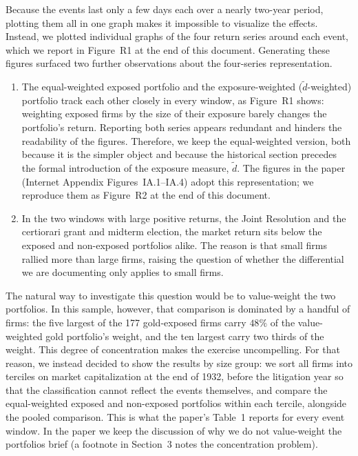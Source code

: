 \noindent Because the events last only a few days each over a nearly two-year period, plotting them all in one graph makes it impossible to visualize the effects. Instead, we plotted individual graphs of the four return series around each event, which we report in Figure~R1 at the end of this document. Generating these figures surfaced two further observations about the four-series representation.
\begin{enumerate}
\item The equal-weighted exposed portfolio and the exposure-weighted ($\tilde{d}$-weighted) portfolio track each other closely in every window, as Figure~R1 shows: weighting exposed firms by the size of their exposure barely changes the portfolio's return. Reporting both series appears redundant and hinders the readability of the figures. Therefore, we keep the equal-weighted version, both because it is the simpler object and because the historical section precedes the formal introduction of the exposure measure, $\tilde{d}$. The figures in the paper (Internet Appendix Figures~IA.1--IA.4) adopt this representation; we reproduce them as Figure~R2 at the end of this document.
\item In the two windows with large positive returns, the Joint Resolution and the certiorari grant and midterm election, the market return sits below the exposed and non-exposed portfolios alike. The reason is that small firms rallied more than large firms, raising the question of whether the differential we are documenting only applies to small firms.
\end{enumerate}
\noindent The natural way to investigate this question would be to value-weight the two portfolios. In this sample, however, that comparison is dominated by a handful of firms: the five largest of the 177 gold-exposed firms carry $48\%$ of the value-weighted gold portfolio's weight, and the ten largest carry two thirds of the weight. This degree of concentration makes the exercise uncompelling. For that reason, we instead decided to show the results by size group: we sort all firms into terciles on market capitalization at the end of 1932, before the litigation year so that the classification cannot reflect the events themselves, and compare the equal-weighted exposed and non-exposed portfolios within each tercile, alongside the pooled comparison. This is what the paper's Table~1 reports for every event window. In the paper we keep the discussion of why we do not value-weight the portfolios brief (a footnote in Section~3 notes the concentration problem).

